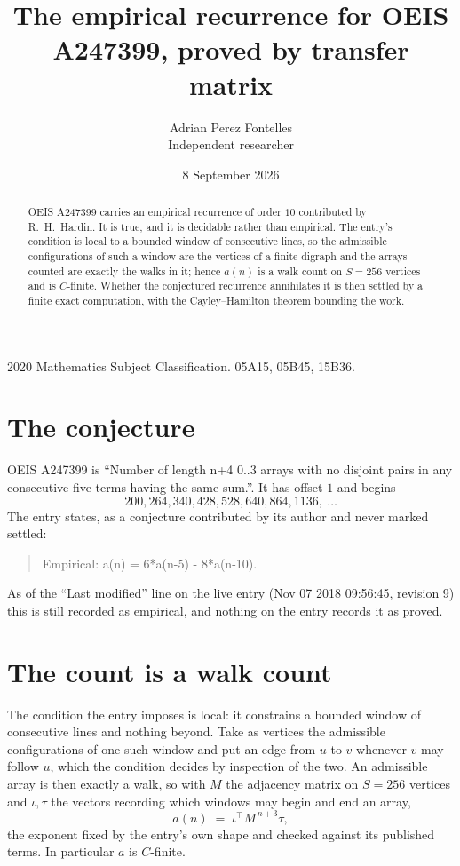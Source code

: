 \documentclass[11pt,a4paper]{article}
\title{The empirical recurrence for OEIS A247399, proved by transfer matrix}
\author{Adrian Perez Fontelles\\ \small Independent researcher}
\date{8 September 2026}
\theoremstyle{plain}
\theoremstyle{definition}
\begin{document}
\maketitle

\begin{abstract}
OEIS A247399 carries an empirical recurrence of order $10$ contributed by R.~H.~Hardin. It is
true, and it is decidable rather than empirical. The entry's condition is local to a bounded window of consecutive lines, so
the admissible configurations of such a window are the vertices of a finite digraph and the
arrays counted are exactly the walks in it; hence $a(n)$ is a walk count on $S=256$ vertices
and is $C$-finite. Whether the conjectured recurrence annihilates it is then settled by a
finite exact computation, with the Cayley--Hamilton theorem bounding the work.
\end{abstract}

\noindent\small 2020 Mathematics Subject Classification. 05A15, 05B45, 15B36.\normalsize

\section{The conjecture}

OEIS A247399 is ``Number of length n+4 0..3 arrays with no disjoint pairs in any consecutive five terms having the same sum.''. It has offset $1$ and begins
\[
200, 264, 340, 428, 528, 640, 864, 1136,\ \dots
\]
The entry states, as a conjecture contributed by its author and never marked settled:
\begin{quote}
Empirical: a(n) = 6*a(n-5) - 8*a(n-10).
\end{quote}
As of the ``Last modified'' line on the live entry (Nov 07 2018 09:56:45, revision 9) this is still
recorded as empirical, and nothing on the entry records it as proved.

\section{The count is a walk count}

The condition the entry imposes is local: it constrains a bounded window of consecutive lines and nothing beyond. Take as
vertices the admissible configurations of one such window and put an edge from $u$ to $v$
whenever $v$ may follow $u$, which the condition decides by inspection of the two. An
admissible array is then exactly a walk, so with $M$ the adjacency matrix on $S=256$ vertices
and $\iota,\tau$ the vectors recording which windows may begin and end an array,
\[
a(n)\;=\;\iota^{\!\top}M^{\,n+3}\tau ,
\]
the exponent fixed by the entry's own shape and checked against its published terms. In
particular $a$ is $C$-finite.
\end{document}
